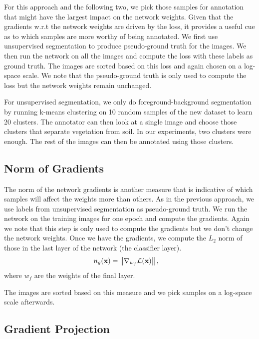 \documentclass[letterpaper, 10 pt, conference]{ieeeconf}  %
\begin{document}
For this approach and the following two, we pick those samples for annotation that might have the largest impact on the network weights. Given that the gradients w.r.t the network weights are driven by the loss, it provides a useful cue as to which samples are more worthy of being annotated. We first use unsupervised segmentation to produce pseudo-ground truth for the images. We then run the network on all the images and compute the loss with these labels as ground truth. The images are sorted based on this loss and again chosen on a log-space scale. We note that the pseudo-ground truth is only used to compute the loss but the network weights remain unchanged. 

For unsupervised segmentation, we only do foreground-background segmentation by running k-means clustering on 10 random samples of the new dataset to learn 20 clusters. The annotator can then look at a single image and choose those clusters that separate vegetation from soil. In our experiments, two clusters were enough. The rest of the images can then be annotated using those clusters. 


\subsection{Norm of Gradients} \label{sec:grad_norm}

The norm of the network gradients is another measure that is indicative of which samples will affect the weights more than others. As in the previous approach, we use labels from unsupervised segmentation as pseudo-ground truth. We run the network on the training images for one epoch and compute the gradients. Again we note that this step is only used to compute the gradients but we don't change the network weights. Once we have the gradients, we compute the $L_2$ norm of those in the last layer of the network (the classifier layer).
\begin{align}
n_g(\bold{x}) &=  \left\lVert \nabla_{w_f} \mathcal{L}(\bold{x}) \right\rVert,
\end{align}  
where $w_f$ are the weights of the final layer.

The images are sorted based on this measure and we pick samples on a log-space scale afterwards.

\subsection{Gradient Projection} \label{sec:grad_proj}
\end{document}
